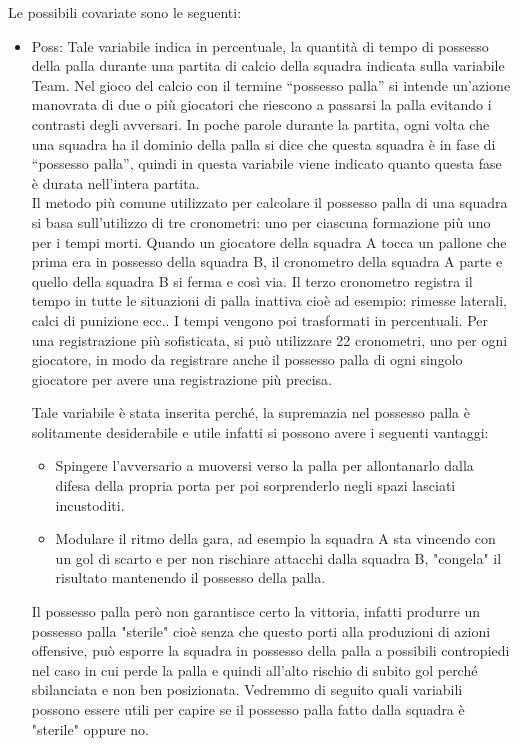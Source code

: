 Le possibili covariate sono le seguenti:
\begin{itemize}
	
	\item \textsf{Poss}: Tale variabile indica in percentuale, la quantità di tempo di possesso della palla durante una partita di calcio della squadra indicata sulla variabile \textsf{Team}. Nel gioco del calcio con il termine “possesso palla” si intende un’azione manovrata di due o più giocatori che riescono a passarsi la palla evitando i contrasti degli avversari. In poche parole durante la partita, ogni volta che una squadra ha il dominio della palla si dice che questa squadra è in fase di “possesso palla”, quindi in questa variabile viene indicato quanto questa fase è durata nell'intera partita.\\
	Il metodo più comune utilizzato per calcolare il possesso palla di una squadra si basa sull'utilizzo di tre cronometri: uno per ciascuna formazione più uno per i tempi morti. Quando un giocatore della squadra A tocca un pallone che prima era in possesso della squadra B, il cronometro della squadra A parte e quello della squadra B si ferma e così via. Il terzo cronometro registra il tempo in tutte le situazioni di palla inattiva cioè ad esempio: rimesse laterali, calci di punizione ecc.. I tempi vengono poi trasformati in percentuali. Per una registrazione più sofisticata, si può utilizzare 22 cronometri, uno per ogni giocatore, in modo da registrare anche il possesso palla di ogni singolo giocatore per avere una registrazione più precisa.
	
	Tale variabile è stata inserita perché, la supremazia nel possesso palla è solitamente desiderabile e utile infatti si possono avere i seguenti vantaggi:
	\begin{itemize}
		\item Spingere l’avversario a muoversi verso la palla per allontanarlo dalla difesa della propria porta per poi sorprenderlo negli spazi lasciati incustoditi.   
		\item Modulare il ritmo della gara, ad esempio la squadra A sta vincendo con un gol di scarto e per non rischiare attacchi dalla squadra B, "congela" il risultato mantenendo il possesso della palla.
	\end{itemize}
	Il possesso palla però non garantisce certo la vittoria, infatti produrre un possesso palla "sterile" cioè senza che questo porti alla produzioni di azioni offensive, può esporre la squadra in possesso della palla a possibili contropiedi nel caso in cui perde la palla e quindi all'alto rischio di subito gol perché sbilanciata e non ben posizionata. Vedremmo di seguito quali variabili possono essere utili per capire se il possesso palla fatto dalla squadra è "sterile" oppure no.


\end{itemize}
